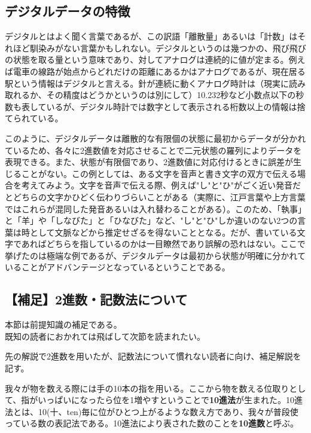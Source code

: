 \subsection{デジタルデータの特徴}
デジタルとはよく聞く言葉であるが、この訳語「離散量」あるいは「計数」はそれほど馴染みがない言葉かもしれない。デジタルというのは幾つかの、飛び飛びの状態を取る量という意味であり、対してアナログは連続的に値が定まる。例えば電車の線路が始点からどれだけの距離にあるかはアナログであるが、現在居る駅という情報はデジタルと言える。針が連続に動くアナログ時計は（現実に読み取れるか、その精度はどうかというのは別にして）10.232秒など小数点以下の秒数も表しているが、デジタル時計では数字として表示される桁数以上の情報は捨てられている。

このように、デジタルデータは離散的な有限個の状態に最初からデータが分かれているため、各々に2進数値を対応させることで二元状態の羅列によりデータを表現できる。また、状態が有限個であり、2進数値に対応付けるときに誤差が生じることがない。この例としては、ある文字を音声と書き文字の双方で伝える場合を考えてみよう。文字を音声で伝える際、例えば"し"と"ひ"がごく近い発音だとどちらの文字かひどく伝わりづらいことがある（実際に、江戸言葉や上方言葉ではこれらが混同した発音あるいは入れ替わることがある）。このため、「執事」と「羊」や「しなびた」と「ひなびた」など、"し"と"ひ"しか違いのない2つの言葉は時として文脈などから推定せざるを得ないこととなる。だが、書いている文字であればどちらを指しているのかは一目瞭然であり誤解の恐れはない。ここで挙げたのは極端な例であるが、デジタルデータは最初から状態が明確に分かれていることがアドバンテージとなっているということである。

\subsection{【補足】2進数・記数法について}
\begin{center}
\begin{minipage}[]{0.75\linewidth}
\begin{screen}
\begin{center}
本節は前提知識の補足である。\\
既知の読者におかれては飛ばして次節を読まれたい。
\end{center}
\end{screen}
\end{minipage}
\end{center}

先の解説で2進数を用いたが、記数法について慣れない読者に向け、補足解説を記す。

我々が物を数える際には手の10本の指を用いる。ここから物を数える位取りとして、指がいっぱいになったら位を1増やすということで\textbf{10進法}が生まれた。10進法とは、10(十、ten)毎に位がひとつ上がるような数え方であり、我々が普段使っている数の表記法である。10進法により表された数のことを\textbf{10進数}と呼ぶ。

